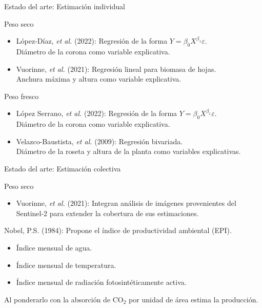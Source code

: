 \documentclass[aspectratio=169]{beamer}
\begin{document}
\begin{frame}{Estado del arte: Estimación individual}
	\begin{minipage}{0.5\textwidth}
		\begin{block}{Peso seco}
			\begin{itemize}
				\item López-Díaz, \textit{et al.} (2022): Regresión de la forma $Y=\beta_0 X^{\beta_1}\varepsilon$.\\
				Diámetro de la corona como variable explicativa.
				\item Vuorinne, \textit{et al.} (2021): Regresión lineal para biomasa de hojas.\\
				Anchura máxima y altura como variable explicativa.
			\end{itemize}
		\end{block}
	\end{minipage}%
	\begin{minipage}{0.5\textwidth}
		\begin{block}{Peso fresco}
			\begin{itemize}
				\item López Serrano, \textit{et al.} (2022): Regresión de la forma $Y=\beta_0 X^{\beta_1}\varepsilon$.\\
				Diámetro de la corona como variable explicativa.
				\item Velazco-Baustista, \textit{et al.} (2009): Regresión bivariada.\\
				Diámetro de la roseta y altura de la planta como variables explicativas.
			\end{itemize}
		\end{block}
	\end{minipage}
\end{frame}

\begin{frame}{Estado del arte: Estimación colectiva}
	\begin{minipage}{0.5\textwidth}
		\begin{block}{Peso seco}
			\begin{itemize}
				\item Vuorinne, \textit{et al.} (2021): Integran análisis de imágenes provenientes del Sentinel-2 para extender la cobertura de sus estimaciones.
			\end{itemize}
		\end{block}
	\end{minipage}%
	\begin{minipage}{0.5\textwidth}
		\begin{block}{}
			Nobel, P.S. (1984): Propone el índice de productividad ambiental (EPI).
			\begin{itemize}
				\item Índice mensual de agua.
				\item Índice mensual de temperatura.
				\item Índice mensual de radiación fotosintéticamente activa. 
			\end{itemize}
			Al ponderarlo con la absorción de CO$_2$ por unidad de área estima la producción.
		\end{block}
	\end{minipage}
\end{frame}
\end{document}
